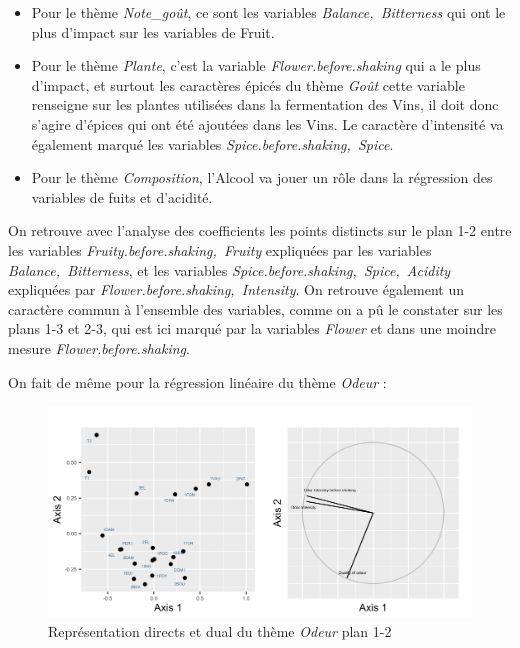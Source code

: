 \documentclass[a4paper,french,10pt]{article}
\begin{document}
\begin{itemize}
	\item Pour le thème \textit{Note\_goût}, ce sont les variables \textit{Balance,~Bitterness} qui ont le plus d'impact sur les variables de Fruit.
	\item Pour le thème \textit{Plante}, c'est la variable \textit{Flower.before.shaking} qui a le plus d'impact, et surtout les caractères épicés du thème \textit{Goût} cette variable renseigne sur les plantes utilisées dans la fermentation des Vins, il doit donc s'agire d'épices qui ont été ajoutées dans les Vins. Le caractère d'intensité va également marqué les variables \textit{Spice.before.shaking,~Spice}.
	\item Pour le thème \textit{Composition}, l'Alcool va jouer un rôle dans la régression des variables de fuits et d'acidité. 
\end{itemize}

On retrouve avec l'analyse des coefficients les points distincts sur le plan 1-2 entre les variables \textit{Fruity.before.shaking,~Fruity} expliquées par les variables \textit{Balance,~Bitterness}, et les variables \textit{Spice.before.shaking,~Spice,~Acidity} expliquées par \textit{Flower.before.shaking,~Intensity}. On retrouve également un caractère commun à l'ensemble des variables, comme on a pû le constater sur les plans 1-3 et 2-3, qui est ici marqué par la variables \textit{Flower} et dans une moindre mesure \textit{Flower.before.shaking}. \newline

On fait de même pour la régression linéaire du thème \textit{Odeur} : 

\begin{figure}[htp] 
	\centering
	\includegraphics[scale=0.8]{images/Plot.IndVar_B1_1.2.png}
	\caption{Représentation directs et dual du thème \textit{Odeur} plan 1-2}
\end{figure}
\end{document}
